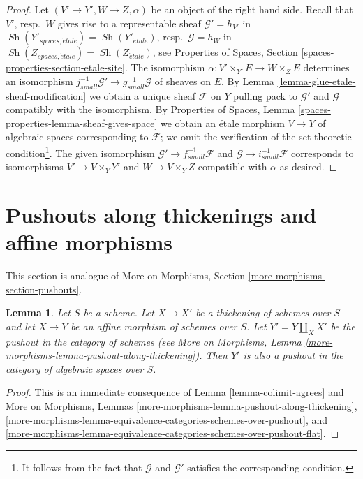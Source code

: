 \documentclass{stacks-project}
\theoremstyle{plain}
\newtheorem{lemma}[subsection]{Lemma}
\theoremstyle{definition}
\theoremstyle{remark}
\numberwithin{equation}{subsection}
\def\Sh{\mathop{\mathit{Sh}}\nolimits}
\def\etale{{\acute{e}tale}}
\begin{document}
\begin{proof}
Let $(V' \to Y', W \to Z, \alpha)$ be an object of the right hand side.
Recall that $V'$, resp.\ $W$ gives rise to a representable sheaf
$\mathcal{G}' = h_{V'}$ in $\Sh(Y'_{spaces, \etale}) = \Sh(Y'_\etale)$,
resp.\ $\mathcal{G} = h_W$ 
in $\Sh(Z_{spaces, \etale}) = \Sh(Z_\etale)$, see
Properties of Spaces, Section \ref{spaces-properties-section-etale-site}.
The isomorphism $\alpha : V' \times_{Y'} E \to W \times_Z E$
determines an isomorphism
$j_{small}^{-1}\mathcal{G}' \to g_{small}^{-1}\mathcal{G}$ of
sheaves on $E$.
By Lemma \ref{lemma-glue-etale-sheaf-modification}
we obtain a unique sheaf $\mathcal{F}$ on $Y$ pulling pack
to $\mathcal{G}'$ and $\mathcal{G}$ compatibly with the isomorphism.
By Properties of Spaces, Lemma \ref{spaces-properties-lemma-sheaf-gives-space}
we obtain an \'etale morphism $V \to Y$ of algebraic spaces
corresponding to $\mathcal{F}$; we omit the verification of
the set theoretic condition\footnote{It follows from the
fact that $\mathcal{G}$ and $\mathcal{G}'$ satisfies the
corresponding condition.}.
The given isomorphism $\mathcal{G}' \to f_{small}^{-1}\mathcal{F}$
and $\mathcal{G} \to i_{small}^{-1}\mathcal{F}$
corresponds to isomorphisms $V' \to V \times_Y Y'$
and $W \to V \times_Y Z$ compatible
with $\alpha$ as desired.
\end{proof}









\section{Pushouts along thickenings and affine morphisms}
\label{section-pushouts}

\noindent
This section is analogue of
More on Morphisms, Section \ref{more-morphisms-section-pushouts}.

\begin{lemma}
\label{lemma-pushout-along-thickening-schemes}
Let $S$ be a scheme. Let $X \to X'$ be a thickening of schemes
over $S$ and let $X \to Y$ be an affine morphism of schemes over $S$.
Let $Y' = Y \amalg_X X'$ be the pushout in the category of schemes (see
More on Morphisms, Lemma \ref{more-morphisms-lemma-pushout-along-thickening}).
Then $Y'$ is also a pushout in the category of algebraic spaces over $S$.
\end{lemma}

\begin{proof}
This is an immediate consequence of Lemma \ref{lemma-colimit-agrees} and
More on Morphisms, Lemmas
\ref{more-morphisms-lemma-pushout-along-thickening},
\ref{more-morphisms-lemma-equivalence-categories-schemes-over-pushout}, and
\ref{more-morphisms-lemma-equivalence-categories-schemes-over-pushout-flat}.
\end{proof}
\end{document}
